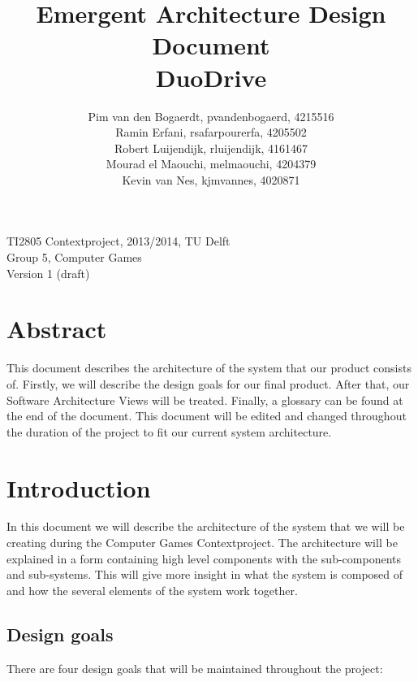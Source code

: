 \documentclass[11pt,twoside,a4paper]{article}
\title{
  Emergent Architecture Design Document\\
  DuoDrive
}
\author{
	Pim van den Bogaerdt, pvandenbogaerd, 4215516\\
	Ramin Erfani, rsafarpourerfa, 4205502\\
	Robert Luijendijk, rluijendijk, 4161467\\
	Mourad el Maouchi, melmaouchi, 4204379\\
	Kevin van Nes, kjmvannes, 4020871
}
\begin{document}
\maketitle
\begin{center}
TI2805 Contextproject, 2013/2014, TU Delft\\
Group 5, Computer Games\\
Version 1 (draft)
\end{center}
\clearpage


\section*{Abstract}
This document describes the architecture of the system that our product consists of. Firstly, we will describe the design goals for our final product. After that, our Software Architecture Views will be treated. Finally, a glossary can be found at the end of the document. This document will be edited and changed throughout the duration of the project to fit our current system architecture.


\clearpage
\tableofcontents

\clearpage


\section{Introduction}
In this document we will describe the architecture of the system that we will be creating during the Computer Games Contextproject. The architecture will be explained in a form containing high level components with the sub-components and sub-systems. This will give more insight in what the system is composed of and how the several elements of the system work together. 


\subsection{Design goals}
There are four design goals that will be maintained throughout the project:
\end{document}
